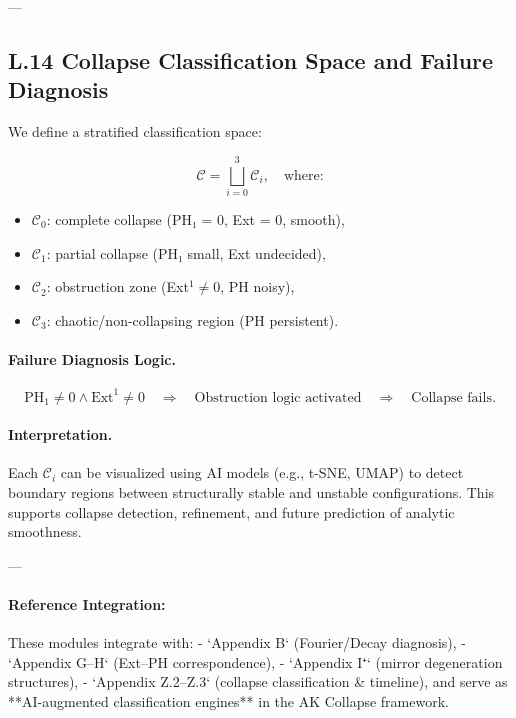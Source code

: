 \documentclass[11pt]{article}
\begin{document}
\begin{axiom}
\begin{axiom}
{{---

\subsection*{L.14 Collapse Classification Space and Failure Diagnosis}

We define a stratified classification space:

\[
\mathcal{C} = \bigsqcup_{i=0}^3 \mathcal{C}_i, \quad \text{where:}
\]

\begin{itemize}
  \item \( \mathcal{C}_0 \): complete collapse (PH₁ = 0, Ext = 0, smooth),
  \item \( \mathcal{C}_1 \): partial collapse (PH₁ small, Ext undecided),
  \item \( \mathcal{C}_2 \): obstruction zone (Ext$^1 \ne 0$, PH noisy),
  \item \( \mathcal{C}_3 \): chaotic/non-collapsing region (PH persistent).
\end{itemize}

\paragraph{Failure Diagnosis Logic.}
\[
\text{PH}_1 \ne 0 \land \mathrm{Ext}^1 \ne 0 
\quad \Rightarrow \quad \text{Obstruction logic activated}
\quad \Rightarrow \quad \text{Collapse fails}.
\]

\paragraph{Interpretation.}  
Each \( \mathcal{C}_i \) can be visualized using AI models (e.g., t-SNE, UMAP) to detect boundary regions  
between structurally stable and unstable configurations.  
This supports collapse detection, refinement, and future prediction of analytic smoothness.

---

\paragraph{Reference Integration:}  
These modules integrate with:
- `Appendix B` (Fourier/Decay diagnosis),
- `Appendix G–H` (Ext–PH correspondence),
- `Appendix I⁺` (mirror degeneration structures),
- `Appendix Z.2–Z.3` (collapse classification & timeline),
and serve as **AI-augmented classification engines** in the AK Collapse framework.


}}
\end{axiom}
\end{axiom}
\end{document}
